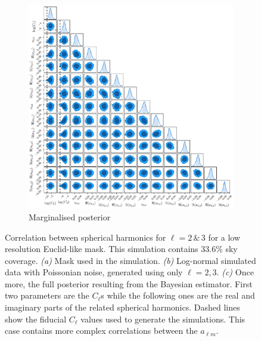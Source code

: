 \begin{figure}
\begin{subfigure}[b]{\textwidth}
 \includegraphics[width=1.05\textwidth]{BPL-FIGS/Flask-Euclid-lowEll-N8_trianglePlot.pdf}
  \caption{Marginalised posterior}
  \label{fig:BPL:LN-Euclid-N8-triang}
\end{subfigure}
\caption[Investigation of correlation in spherical harmonics for $\ell = 2\, \& \, 3$ for a low resolution Euclid-like mask containing a 33.6\% sky fraction]{Correlation between spherical harmonics for $\ell = 2\, \& \, 3$ for a low resolution Euclid-like mask. This simulation contains 33.6\% sky coverage. \textit{(a)} Mask used in the simulation. \textit{(b)} Log-normal simulated data with Poissonian noise, generated using only $\ell = 2,3$. \textit{(c)} Once more, the full posterior resulting from the Bayesian estimator. First two parameters are the $C_{\ell}$s while the following ones are the real and imaginary parts of the related spherical harmonics. Dashed lines show the fiducial $C_{\ell}$ values used to generate the simulations. This case contains more complex correlations between the $a_{\ell m}$.}
\label{fig:BPL:Euclid-N8}
\end{figure}

